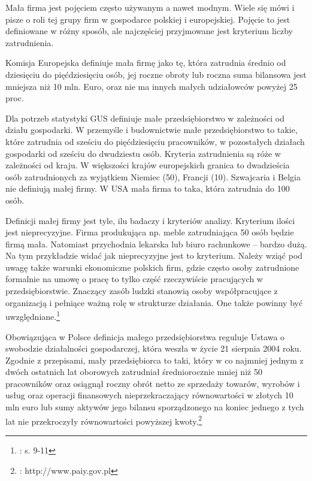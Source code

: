 Mała firma jest pojęciem często używanym a nawet modnym. Wiele się mówi  i pisze o roli tej grupy firm w gospodarce polskiej i europejskiej. Pojęcie to jest definiowane w różny sposób, ale najczęściej przyjmowane jest kryterium liczby zatrudnienia.

Komisja Europejska definiuje mała firmę jako tę, która zatrudnia średnio od dziesięciu do pięćdziesięciu osób, jej roczne obroty lub roczna suma bilansowa jest mniejsza niż 10 mln. Euro, oraz nie ma innych małych udziałowców powyżej 25 proc.

Dla potrzeb statystyki GUS definiuje małe przedsiębiorstwo w zależności od działu gospodarki. W przemyśle i budownictwie małe przedsiębiorstwo to takie, które zatrudnia od sześciu do pięćdziesięciu pracowników, w pozostałych działach gospodarki od sześciu do dwudziestu osób. Kryteria zatrudnienia są róże w zależności od kraju. W większości krajów europejskich granica to dwadzieścia osób zatrudnionych za wyjątkiem Niemiec (50), Francji (10). Szwajcaria i Belgia nie definiują małej firmy. W USA mała firma to taka, która zatrudnia do 100 osób.

Definicji małej firmy jest tyle, ilu badaczy i kryteriów analizy. Kryterium ilości jest nieprecyzyjne. Firma produkująca np. meble zatrudniająca 50 osób będzie firmą mała. Natomiast przychodnia lekarska lub biuro rachunkowe – bardzo dużą. Na tym przykładzie widać jak nieprecyzyjne jest to kryterium. Należy wziąć pod uwagę także warunki ekonomiczne polskich firm, gdzie często osoby zatrudnione formalnie na umowę o pracę to tylko część rzeczywiście pracujących w  przedsiębiorstwie. Znaczący zasób ludzki stanowią osoby współpracujące z organizacją i pełniące ważną rolę w strukturze działania. One także powinny być uwzględniane.\footnote{\cite{msr}: s. 9-11}

Obowiązująca w Polsce definicja małego przedsiębiorstwa reguluje Ustawa o swobodzie działalności gospodarczej, która weszła w życie 21 sierpnia 2004 roku.
Zgodnie z przepisami, mały przedsiębiorca to taki, który w co najmniej jednym z dwóch ostatnich lat oborowych zatrudniał średniorocznie mniej niż 50 pracowników oraz osiągnął roczny obrót netto ze sprzedaży towarów, wyrobów i usług oraz operacji finansowych nieprzekraczający równowartości w złotych 10 mln euro lub sumy aktywów jego bilansu sporządzonego na koniec jednego z tych lat nie przekroczyły równowartości powyższej kwoty.\footnote{\cite{paiz}: http://www.paiy.gov.pl}

